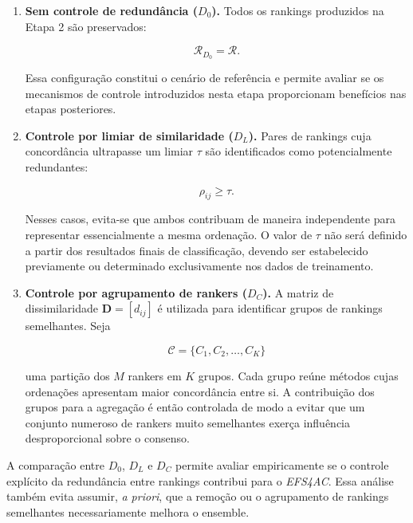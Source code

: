 \begin{enumerate}

    \item \textbf{Sem controle de redundância ($D_0$).}
    Todos os rankings produzidos na Etapa 2 são preservados:

    \begin{equation}
        \mathcal{R}_{D_0}=\mathcal{R}.
    \end{equation}

    Essa configuração constitui o cenário de referência e permite avaliar se
    os mecanismos de controle introduzidos nesta etapa proporcionam benefícios
    nas etapas posteriores.

    \item \textbf{Controle por limiar de similaridade ($D_L$).}
    Pares de rankings cuja concordância ultrapasse um limiar $\tau$ são
    identificados como potencialmente redundantes:

    \begin{equation}
        \rho_{ij}\geq\tau.
        \label{eq:limiar-similaridade-ac-efs}
    \end{equation}

    Nesses casos, evita-se que ambos contribuam de maneira independente para
    representar essencialmente a mesma ordenação. O valor de $\tau$ não será
    definido a partir dos resultados finais de classificação, devendo ser
    estabelecido previamente ou determinado exclusivamente nos dados de
    treinamento.

    \item \textbf{Controle por agrupamento de rankers ($D_C$).}
    A matriz de dissimilaridade $\mathbf{D}=[d_{ij}]$ é utilizada para
    identificar grupos de rankings semelhantes. Seja

    \begin{equation}
        \mathcal{C}
        =
        \{C_1,C_2,\ldots,C_K\}
    \end{equation}

    uma partição dos $M$ rankers em $K$ grupos. Cada grupo reúne métodos cujas
    ordenações apresentam maior concordância entre si. A contribuição dos
    grupos para a agregação é então controlada de modo a evitar que um conjunto
    numeroso de rankers muito semelhantes exerça influência desproporcional
    sobre o consenso.

\end{enumerate}

A comparação entre $D_0$, $D_L$ e $D_C$ permite avaliar empiricamente se o
controle explícito da redundância entre rankings contribui para o
\textit{EFS4AC}. Essa análise também evita assumir, \textit{a priori}, que a
remoção ou o agrupamento de rankings semelhantes necessariamente melhora o
ensemble.


